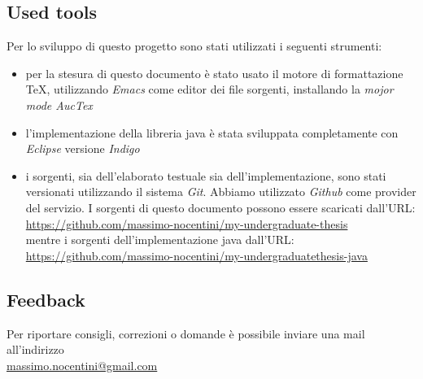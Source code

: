 \subsection{Used tools}
Per lo sviluppo di questo progetto sono stati utilizzati i seguenti
strumenti:
\begin{itemize}
\item per la stesura di questo documento \`e stato usato il motore di
  formattazione \TeX, utilizzando \emph{Emacs} come editor dei file
  sorgenti, installando la \emph{mojor mode AucTex}
\item l'implementazione della libreria java \`e stata sviluppata
  completamente con \emph{Eclipse} versione \emph{Indigo}
\item i sorgenti, sia dell'elaborato testuale sia
  dell'implementazione, sono stati versionati utilizzando il sistema
  \emph{Git}. Abbiamo utilizzato \emph{Github} come provider del
  servizio. I sorgenti di questo documento possono essere scaricati
  dall'URL:\\
  \href{https://github.com/massimo-nocentini/my-undergraduate-thesis}{
    https://github.com/massimo-nocentini/my-undergraduate-thesis}\\
  mentre i sorgenti dell'implementazione java dall'URL:\\
  \href{https://github.com/massimo-nocentini/my-undergraduatethesis-java}{
    https://github.com/massimo-nocentini/my-undergraduatethesis-java}
\end{itemize}

\subsection{Feedback}
Per riportare consigli, correzioni o domande \`e possibile inviare una
mail all'indirizzo \\
\href{massimo.nocentini@gmail.com}{massimo.nocentini@gmail.com}
